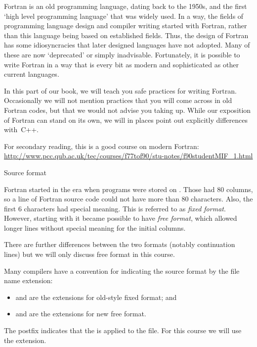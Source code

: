 
Fortran is an old programming language, dating back to the 1950s, and
the first `high level programming language' that was widely used.
In a way, the fields of programming language design and compiler
writing started with Fortran, rather than this language being based on
established fields. Thus, the design of Fortran has some
idiosyncracies that later designed languages have not adopted. Many of
these are now `deprecated' or simply inadvisable. Fortunately, it is
possible to write Fortran in a way that is every bit as modern and
sophisticated as other current languages.

In this part of our book, we will teach you safe practices for
writing Fortran. Occasionally we will not mention practices that you
will come across in old Fortran codes, but that we would not advise
you taking up. While our exposition of Fortran can stand on its own,
we will in places point out explicitly differences with~C++.

For secondary reading, this is a good course on modern Fortran:
\url{http://www.pcc.qub.ac.uk/tec/courses/f77tof90/stu-notes/f90studentMIF_1.html}

 {Source format}

Fortran started in the era when programs were stored on
. Those had 80 columns, so a line of Fortran
source code could not have more than 80 characters. Also, the first 6
characters had special meaning. This is referred to as \emph{fixed
  format}. However, starting with
 it became possible to have \emph{free
  format}, which allowed longer lines
without special meaning for the initial columns.

There are further differences between the two formats (notably
continuation lines) but we will only discuss free format in this course.

Many compilers have a convention for indicating the source format by
the file name extension:
\begin{itemize}
\item {} and  are the extensions for old-style fixed format;
  and
\item {} and  are the extensions for new free format.
\end{itemize}
The postfix  indicates that the 
is applied to the file.
For this course we will use the  extension.

